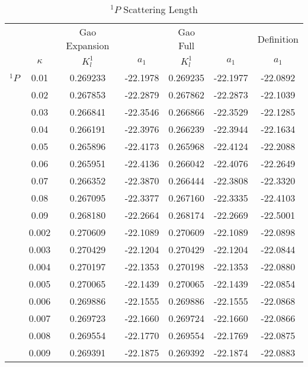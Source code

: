 \documentclass[Dissertation.tex]{subfiles}
\begin{document}
\begin{table}[H]
	\centering
	\normalsize
	\begin{tabular}{c c | c c | c c | c}
	\toprule
			& & Gao Expansion & & Gao Full & & Definition \\
			& $\kappa$ & $K_l^1$ & $a_1$ & $K_l^1$ & $a_1$ & $a_1$ \\
	\midrule
		$^1P$ & 0.01 & 0.269233 & -22.1978 & 0.269235 & -22.1977 & -22.0892\\
			 & 	0.02 & 	0.267853 & -22.2879 & 0.267862 & -22.2873 & -22.1039\\
			 & 	0.03 & 	0.266841 & -22.3546 & 0.266866 & -22.3529 & -22.1285\\
			 & 	0.04 & 	0.266191 & -22.3976 & 0.266239 & -22.3944 & -22.1634\\
			 & 	0.05 & 	0.265896 & -22.4173 & 0.265968 & -22.4124 & -22.2088\\
			 & 	0.06 & 	0.265951 & -22.4136 & 0.266042 & -22.4076 & -22.2649\\
			 & 	0.07 & 	0.266352 & -22.3870 & 0.266444 & -22.3808 & -22.3320\\
			 & 	0.08 & 	0.267095 & -22.3377 & 0.267160 & -22.3335 & -22.4103\\
			 & 	0.09 & 	0.268180 & -22.2664 & 0.268174 & -22.2669 & -22.5001\\
	\midrule
			 & 	0.002 & 0.270609 & -22.1089 & 0.270609 & -22.1089 & -22.0898\\
			 & 	0.003 & 0.270429 & -22.1204 & 0.270429 & -22.1204 & -22.0844\\
			 & 	0.004 & 0.270197 & -22.1353 & 0.270198 & -22.1353 & -22.0880\\
			 & 	0.005 & 0.270065 & -22.1439 & 0.270065 & -22.1439 & -22.0854\\
			 & 	0.006 & 0.269886 & -22.1555 & 0.269886 & -22.1555 & -22.0868\\
			 & 	0.007 & 0.269723 & -22.1660 & 0.269724 & -22.1660 & -22.0866\\
			 & 	0.008 & 0.269554 & -22.1770 & 0.269554 & -22.1769 & -22.0875\\
			 & 	0.009 & 0.269391 & -22.1875 & 0.269392 & -22.1874 & -22.0883\\
	\bottomrule
	\end{tabular}
	\caption{$^1P$ Scattering Length}
	\label{tab:PWaveScatLen1}
\end{table}
\end{document}
